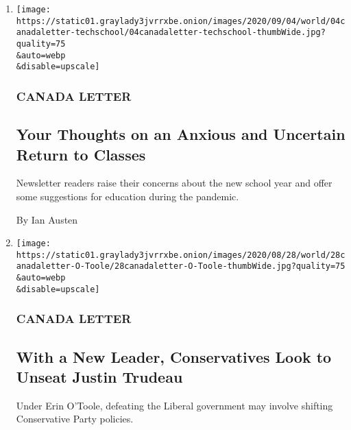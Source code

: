 \begin{enumerate}
\def\labelenumi{\arabic{enumi}.}
\item
  \href{/2020/09/04/world/canada/your-thoughts-on-an-anxious-and-uncertain-return-to-classes.html}{}

  \texttt{[image: https://static01.graylady3jvrrxbe.onion/images/2020/09/04/world/04canadaletter-techschool/04canadaletter-techschool-thumbWide.jpg?quality=75\\\&auto=webp\\\&disable=upscale]}

  \hypertarget{canada-letter}{%
  \subsubsection{CANADA LETTER}\label{canada-letter}}

  \hypertarget{your-thoughts-on-an-anxious-and-uncertain-return-to-classes}{%
  \subsection{Your Thoughts on an Anxious and Uncertain Return to
  Classes}\label{your-thoughts-on-an-anxious-and-uncertain-return-to-classes}}

  Newsletter readers raise their concerns about the new school year and
  offer some suggestions for education during the pandemic.

  By Ian Austen
\item
  \href{/2020/08/28/world/canada/erin-otoole-conservative-leader.html}{}

  \texttt{[image: https://static01.graylady3jvrrxbe.onion/images/2020/08/28/world/28canadaletter-O-Toole/28canadaletter-O-Toole-thumbWide.jpg?quality=75\\\&auto=webp\\\&disable=upscale]}

  \hypertarget{canada-letter-1}{%
  \subsubsection{CANADA LETTER}\label{canada-letter-1}}

  \hypertarget{with-a-new-leader-conservatives-look-to-unseat-justin-trudeau}{%
  \subsection{With a New Leader, Conservatives Look to Unseat Justin
  Trudeau}\label{with-a-new-leader-conservatives-look-to-unseat-justin-trudeau}}

  Under Erin O'Toole, defeating the Liberal government may involve
  shifting Conservative Party policies.


\end{enumerate}
